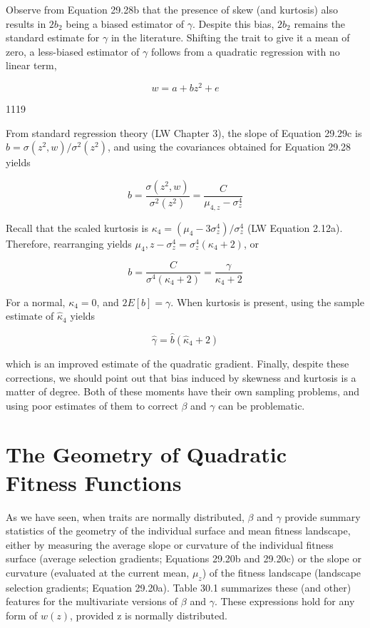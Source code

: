 \documentclass{article}
\begin{document}
Observe from Equation 29.28b that the presence of skew (and kurtosis) also results in  $ 2b_{2} $ being a biased estimator of  $ \gamma $. Despite this bias,  $ 2b_{2} $ remains the standard estimate for  $ \gamma $ in the literature. Shifting the trait to give it a mean of zero, a less-biased estimator of  $ \gamma $ follows from a quadratic regression with no linear term,

\begin{equation}
w=a+b z^{2}+e
\tag{29.29c}
\label{eq:29_29c}
\end{equation}

1119

From standard regression theory (LW Chapter 3), the slope of Equation 29.29c is  $ b = \sigma(z^2, w)/\sigma^2(z^2) $, and using the covariances obtained for Equation 29.28 yields

\begin{equation}
b=\frac{\sigma(z^{2},w)}{\sigma^{2}(z^{2})}=\frac{C}{\mu_{4,z}-\sigma_{z}^{4}}
\tag{29.29d}
\label{eq:29_29d}
\end{equation}

Recall that the scaled kurtosis is  $ \kappa_4 = (\mu_4 - 3\sigma_z^4)/\sigma_z^4 $ (LW Equation 2.12a). Therefore, rearranging yields  $ \mu_4, z - \sigma_z^4 = \sigma_z^4(\kappa_4 + 2) $, or

\begin{equation}
b=\frac{C}{\sigma^{4}(\kappa_{4}+2)}=\frac{\gamma}{\kappa_{4}+2}
\tag{29.29e}
\label{eq:29_29e}
\end{equation}

For a normal,  $ \kappa_4 = 0 $, and  $ 2E[b] = \gamma $. When kurtosis is present, using the sample estimate of  $ \widehat{\kappa}_4 $ yields

\begin{equation}
\widehat{\gamma}=\widehat{b}\left(\widehat{\kappa}_{4}+2\right)
\tag{29.29f}
\label{eq:29_29f}
\end{equation}

which is an improved estimate of the quadratic gradient. Finally, despite these corrections, we should point out that bias induced by skewness and kurtosis is a matter of degree. Both of these moments have their own sampling problems, and using poor estimates of them to correct  $ \beta $ and  $ \gamma $ can be problematic.

\section{The Geometry of Quadratic Fitness Functions}
As we have seen, when traits are normally distributed,  $ \beta $ and  $ \gamma $ provide summary statistics of the geometry of the individual surface and mean fitness landscape, either by measuring the average slope or curvature of the individual fitness surface (average selection gradients; Equations 29.20b and 29.20c) or the slope or curvature (evaluated at the current mean,  $ \mu_{z} $) of the fitness landscape (landscape selection gradients; Equation 29.20a). Table 30.1 summarizes these (and other) features for the multivariate versions of  $ \beta $ and  $ \gamma $. These expressions hold for any form of  $ w(z) $, provided z is normally distributed.
\end{document}
